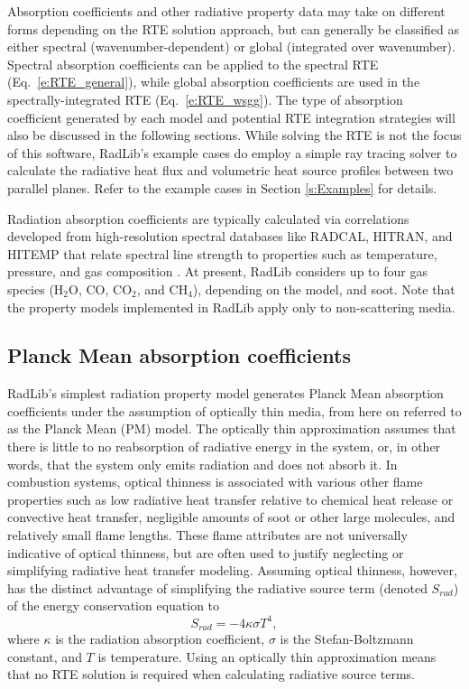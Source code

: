 \documentclass[preprint,12pt]{elsarticle}
\begin{document}
Absorption coefficients and other radiative property data may take on different forms depending on the RTE solution approach, but can generally be classified as either spectral (wavenumber-dependent) or global (integrated over wavenumber). Spectral absorption coefficients can be applied to the spectral RTE (Eq.~\ref{e:RTE_general}), while global absorption coefficients are used in the spectrally-integrated RTE (Eq.~\ref{e:RTE_wsgg}). The type of absorption coefficient generated by each model and potential RTE integration strategies will also be discussed in the following sections. While solving the RTE is not the focus of this software, RadLib's example cases do employ a simple ray tracing solver to calculate the radiative heat flux and volumetric heat source profiles between two parallel planes. Refer to the example cases in Section \ref{s:Examples} for details. 

Radiation absorption coefficients are typically calculated via correlations developed from high-resolution spectral databases like RADCAL, HITRAN, and HITEMP \citep{Grosshandler_1993,Rothman_2010} that relate spectral line strength to properties such as temperature, pressure, and gas composition \citep{Zhang_2002b}. At present, RadLib considers up to four gas species (H$_2$O, CO, CO$_2$, and CH$_4$), depending on the model, and soot. Note that the property models implemented in RadLib apply only to non-scattering media. 


\subsection{Planck Mean absorption coefficients} \label{s:planckmean}

RadLib's simplest radiation property model generates Planck Mean absorption coefficients under the assumption of optically thin media, from here on referred to as the Planck Mean (PM) model.
The optically thin approximation assumes that there is little to no reabsorption of radiative energy in the system, or, in other words, that the system only emits radiation and does not absorb it. In combustion systems, optical thinness is associated with various other flame properties such as low radiative heat transfer relative to chemical heat release or convective heat transfer, negligible amounts of soot or other large molecules, and relatively small flame lengths. These flame attributes are not universally indicative of optical thinness, but are often used to justify neglecting or simplifying radiative heat transfer modeling. Assuming optical thinness, however, has the distinct advantage of simplifying the radiative source term (denoted $S_{rad}$) of the energy conservation equation to 
\begin{equation}
	S_{rad}=-4\kappa \sigma T^4,
\end{equation}
where $\kappa$ is the radiation absorption coefficient, $\sigma$ is the Stefan-Boltzmann constant, and $T$ is temperature. Using an optically thin approximation means that no RTE solution is required when calculating radiative source terms.
\end{document}
